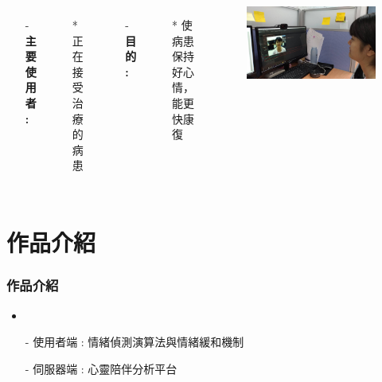 \documentclass[10pt, conference, compsocconf]{beamer}
\begin{document}
\begin{CJK}{UTF8}{}
\begin{frame}
\begin{columns}
\begin{itemize}
\item[-] \large\bf 主要使用者 : 
\end{itemize}
\vspace{1mm}
\begin{itemize}
\item[*] \large 正在接受治療的病患
\end{itemize}
\vspace{3mm}
\begin{itemize}
\item[-] \large\bf 目的 : 
\end{itemize}
\vspace{1mm}
\begin{itemize}
\item[*] \large 使病患保持好心情，能更快康復
\end{itemize}

\begin{figure}[!t]
\begin{flushright}
\includegraphics[width=1\textwidth]{Figures/12.jpg}
\end{flushright}
\end{figure}
\end{columns}

\end{frame}


\section{作品介紹}

\begin{frame}
\frametitle{作品介紹}
\vspace{-8mm}
\begin{itemize}
\item {}
\end{itemize}
\vspace{2mm}
\begin{itemize}
\item[-] 使用者端 : 情緒偵測演算法與情緒緩和機制
\vspace{5mm}
\item[-] 伺服器端 : 心靈陪伴分析平台
\end{itemize}


\end{frame}
\end{CJK}
\end{document}

